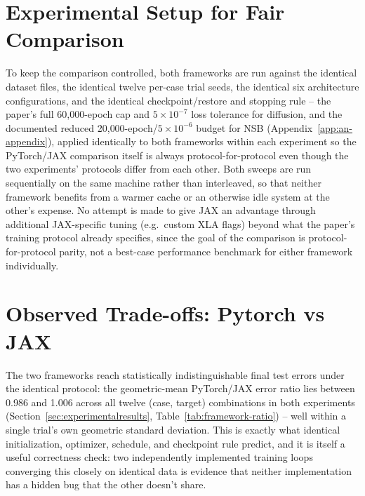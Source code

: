 \section{Experimental Setup for Fair Comparison}

To keep the comparison controlled, both frameworks are run against the
identical dataset files, the identical twelve per-case trial seeds, the
identical six architecture configurations, and the identical
checkpoint/restore and stopping rule -- the paper's full 60{,}000-epoch cap
and $5\times10^{-7}$ loss tolerance for diffusion, and the documented
reduced 20{,}000-epoch/$5\times10^{-6}$ budget for NSB
(Appendix~\ref{app:an-appendix}), applied identically to both frameworks
within each experiment so the PyTorch/JAX comparison itself is always
protocol-for-protocol even though the two experiments' protocols differ
from each other. Both sweeps are run sequentially on the
same machine rather than interleaved, so that neither framework benefits
from a warmer cache or an otherwise idle system at the other's expense.
No attempt is made to give JAX an advantage through additional
JAX-specific tuning (e.g.\ custom XLA flags) beyond what the paper's
training protocol already specifies, since the goal of the comparison is
protocol-for-protocol parity, not a best-case performance benchmark for
either framework individually.

\section{Observed Trade-offs: Pytorch vs JAX}

The two frameworks reach statistically indistinguishable final test errors
under the identical protocol: the geometric-mean PyTorch/JAX error ratio
lies between 0.986 and 1.006 across all twelve (case, target) combinations
in both experiments (Section~\ref{sec:experimentalresults},
Table~\ref{tab:framework-ratio}) -- well within a single trial's own
geometric standard deviation. This is exactly what identical
initialization, optimizer, schedule, and checkpoint rule predict, and it
is itself a useful correctness check: two independently implemented
training loops converging this closely on identical data is evidence that
neither implementation has a hidden bug that the other doesn't share.

